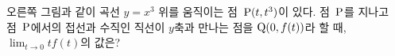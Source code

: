 \noindent\begin{minipage}[t]{0.58\linewidth}\vspace{0pt}\raggedright 오른쪽 그림과 같이 곡선 $y=x^3$ 위를 움직이는 점~$\mathrm{P}(t{,}\mkern3mu\mathopen{}t^3)$이 있다. 점~$\mathrm{P}$를 지나고 점~$\mathrm{P}$에서의 접선과 수직인 직선이 $y$축과 만나는 점을 $\mathrm{Q}(0{,}\mkern3mu\mathopen{}f(t))$라 할 때, $\displaystyle\lim_{t\to 0}tf(t)$의 값은?\end{minipage}\hfill\begin{minipage}[t]{0.4\linewidth}\vspace{0pt}\centering \resizebox{\ifdim\width>\linewidth\linewidth\else\width\fi}{!}{}\end{minipage}\par
{}
